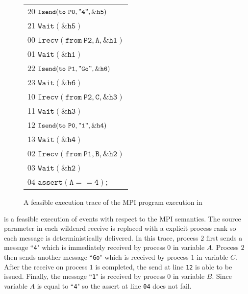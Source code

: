 \begin{figure}[b]
\begin{center}
\setlength{\tabcolsep}{2pt}
\scriptsize \begin{tabular}[t]{l}
20 $\mathtt{Isend(to\ P0, "4", \&h5)}$ \\
21 $\mathtt{Wait(\&h5)}$\\
\hline
00 $\mathtt{Irecv(from\ P2, A, \&h1)}$ \\
01 $\mathtt{Wait(\&h1)}$ \\
\hline
22 $\mathtt{Isend(to\ P1, "Go", \&h6)}$ \\
23 $\mathtt{Wait(\&h6)}$ \\
\hline
10 $\mathtt{Irecv(from\ P2, C, \&h3)}$ \\
11 $\mathtt{Wait(\&h3)}$ \\
12 $\mathtt{Isend(to\ P0, "1", \&h4)}$ \\
13 $\mathtt{Wait(\&h4)}$ \\
\hline
02 $\mathtt{Irecv(from\ P1, B, \&h2)}$ \\
03 $\mathtt{Wait(\&h2)}$ \\
04 $\mathtt{assert(A == 4);}$ \\
\hline
\end{tabular}
\end{center}
\caption{A feasible execution trace of the MPI program execution in }
\label{fig:trace1}
\end{figure}

 is a feasible execution of events with respect to the MPI semantics. The source parameter in each wildcard receive is replaced with a explicit process rank so each message is deterministically delivered. In this trace, process $2$ first sends a message ``\texttt{4}" which is immediately received by process $0$ in variable $A$. Process $2$ then sends another message ``\texttt{Go}" which is received by process $1$ in variable $C$. After the receive on process $1$ is completed, the send at line \texttt{12} is able to be issued. Finally, the message ``\texttt{1}" is received by process $0$ in variable $B$. Since variable $A$ is equal to ``\texttt{4}" so the assert at line \texttt{04} does not fail.

